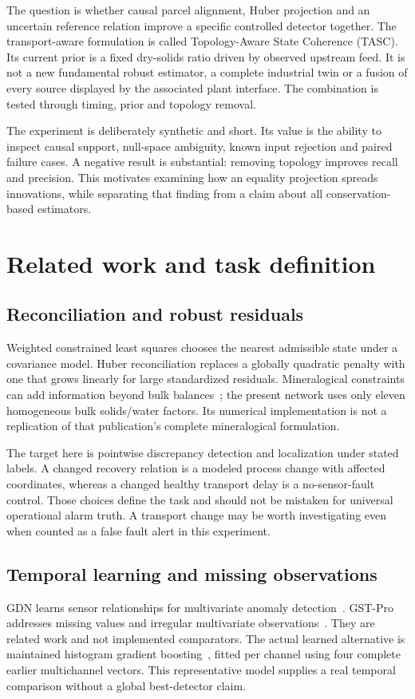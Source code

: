 \documentclass[11pt,a4paper]{article}
\begin{document}
The question is whether causal parcel alignment, Huber projection and an uncertain reference relation improve a specific controlled detector together. The transport-aware formulation is called Topology-Aware State Coherence (TASC). Its current prior is a fixed dry-solids ratio driven by observed upstream feed. It is not a new fundamental robust estimator, a complete industrial twin or a fusion of every source displayed by the associated plant interface. The combination is tested through timing, prior and topology removal.

The experiment is deliberately synthetic and short. Its value is the ability to inspect causal support, null-space ambiguity, known input rejection and paired failure cases. A negative result is substantial: removing topology improves recall and precision. This motivates examining how an equality projection spreads innovations, while separating that finding from a claim about all conservation-based estimators.

\section{Related work and task definition}
\subsection{Reconciliation and robust residuals}
Weighted constrained least squares chooses the nearest admissible state under a covariance model. Huber reconciliation replaces a globally quadratic penalty with one that grows linearly for large standardized residuals. Mineralogical constraints can add information beyond bulk balances~\cite{sadeghi}; the present network uses only eleven homogeneous bulk solids/water factors. Its numerical implementation is not a replication of that publication's complete mineralogical formulation.

The target here is pointwise discrepancy detection and localization under stated labels. A changed recovery relation is a modeled process change with affected coordinates, whereas a changed healthy transport delay is a no-sensor-fault control. Those choices define the task and should not be mistaken for universal operational alarm truth. A transport change may be worth investigating even when counted as a false fault alert in this experiment.

\subsection{Temporal learning and missing observations}
GDN learns sensor relationships for multivariate anomaly detection~\cite{gdn}. GST-Pro addresses missing values and irregular multivariate observations~\cite{gstpro}. They are related work and not implemented comparators. The actual learned alternative is maintained histogram gradient boosting~\cite{hgb}, fitted per channel using four complete earlier multichannel vectors. This representative model supplies a real temporal comparison without a global best-detector claim.
\end{document}
